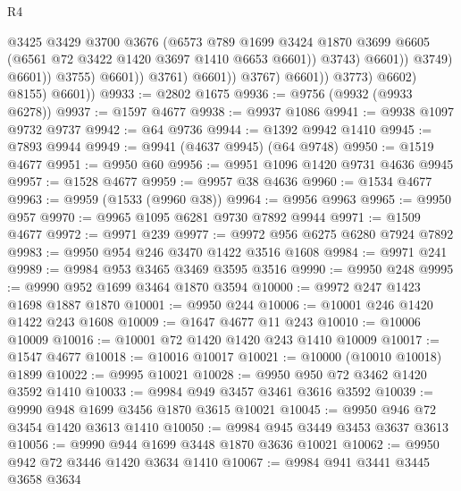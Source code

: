 \begin{lexlean}{R4}
\begin{coremodule}
                                            @3425
                                            @3429
                                            @3700
                                            @3676
                                            (@6573
                                              @789
                                              @1699
                                              @3424
                                              @1870
                                              @3699
                                              @6605
                                              (@6561 @72 @3422 @1420 @3697 @1410 @6653 @6601))
                                            @3743)
                                          @6601))
                                      @3749)
                                    @6601))
                                @3755)
                              @6601))
                          @3761)
                        @6601))
                    @3767)
                  @6601))
              @3773)
            @6602)
          @8155)
        @6601))
@9933 := @2802 @1675
@9936 := @9756 (@9932 (@9933 @6278))
@9937 := @1597 @4677
@9938 := @9937 @1086
@9941 := @9938 @1097 @9732 @9737
@9942 := @64 @9736
@9944 := @1392 @9942 @1410
@9945 := @7893 @9944
@9949 := @9941 (@4637 @9945) (@64 @9748)
@9950 := @1519 @4677
@9951 := @9950 @60
@9956 := @9951 @1096 @1420 @9731 @4636 @9945
@9957 := @1528 @4677
@9959 := @9957 @38 @4636
@9960 := @1534 @4677
@9963 := @9959 (@1533 (@9960 @38))
@9964 := @9956 @9963
@9965 := @9950 @957
@9970 := @9965 @1095 @6281 @9730 @7892 @9944
@9971 := @1509 @4677
@9972 := @9971 @239
@9977 := @9972 @956 @6275 @6280 @7924 @7892
@9983 := @9950 @954 @246 @3470 @1422 @3516 @1608
@9984 := @9971 @241
@9989 := @9984 @953 @3465 @3469 @3595 @3516
@9990 := @9950 @248
@9995 := @9990 @952 @1699 @3464 @1870 @3594
@10000 := @9972 @247 @1423 @1698 @1887 @1870
@10001 := @9950 @244
@10006 := @10001 @246 @1420 @1422 @243 @1608
@10009 := @1647 @4677 @11 @243
@10010 := @10006 @10009
@10016 := @10001 @72 @1420 @1420 @243 @1410 @10009
@10017 := @1547 @4677
@10018 := @10016 @10017
@10021 := @10000 (@10010 @10018) @1899
@10022 := @9995 @10021
@10028 := @9950 @950 @72 @3462 @1420 @3592 @1410
@10033 := @9984 @949 @3457 @3461 @3616 @3592
@10039 := @9990 @948 @1699 @3456 @1870 @3615 @10021
@10045 := @9950 @946 @72 @3454 @1420 @3613 @1410
@10050 := @9984 @945 @3449 @3453 @3637 @3613
@10056 := @9990 @944 @1699 @3448 @1870 @3636 @10021
@10062 := @9950 @942 @72 @3446 @1420 @3634 @1410
@10067 := @9984 @941 @3441 @3445 @3658 @3634

\end{coremodule}
\end{lexlean}
